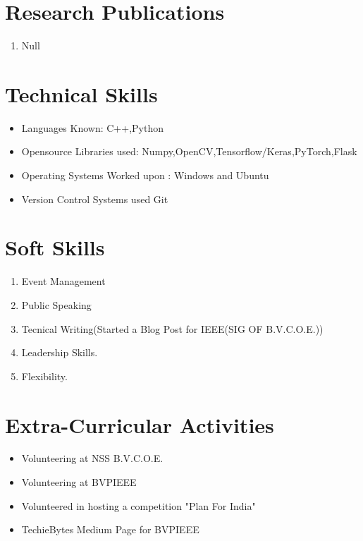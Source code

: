 \documentclass{my_cv}
\begin{document}
	\section{\colorbox{mycolor}{\textcolor{golde}{Research Publications}}}
	\begin{enumerate}
		\item Null
	\end{enumerate}
	\section{\colorbox{mycolor}{\textcolor{golde}{Technical Skills}}}
	\begin{itemize}
		\item Languages Known: C++,Python
		\item Opensource Libraries used: Numpy,OpenCV,Tensorflow/Keras,PyTorch,Flask
		\item Operating Systems Worked upon : Windows and Ubuntu
		\item Version Control Systems used Git
	\end{itemize}
	
	\section{\colorbox{mycolor}{\textcolor{golde}{Soft Skills}}}
	\begin{enumerate}
		\item Event Management
		\item Public Speaking
		\item Tecnical Writing(Started a Blog Post for IEEE(SIG OF B.V.C.O.E.))
		\item Leadership Skills.
		\item Flexibility.
	\end{enumerate}
	
	\section{\colorbox{mycolor}{\textcolor{golde}{Extra-Curricular Activities}}}
		\begin{itemize}
			\item Volunteering at NSS B.V.C.O.E.
			\item Volunteering at BVPIEEE
			\item Volunteered in hosting a competition "Plan For India"
			\item TechieBytes Medium Page for BVPIEEE
		\end{itemize}
\end{document}
